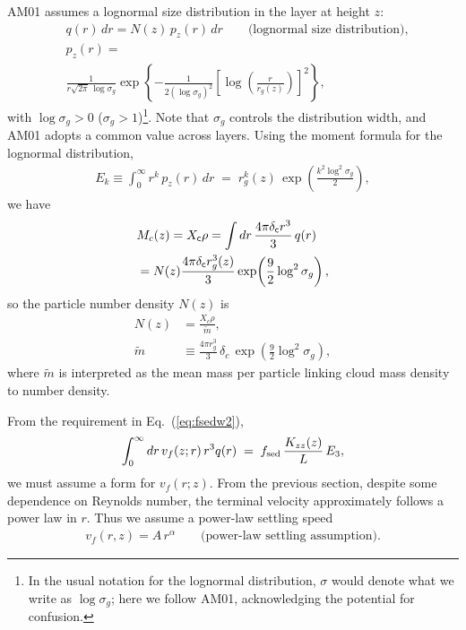 AM01 assumes a lognormal size distribution in the layer at height $z$:
\begin{align}
\label{eq:lognormal_am01}
&q(r)\, dr = N(z)\, p_z(r)\, dr \qquad\text{(lognormal size distribution)}, \\
&p_z(r) = \nonumber \\
&\frac{1}{r \sqrt{2 \pi}\, \log{\sigma_g}} 
\exp\!\left\{ - \frac{1}{2 (\log{\sigma_g})^2} \left[\log\!\left(\frac{r}{r_g(z)}\right)\right]^{\!2} \right\},
\end{align}
with $\log{\sigma_g}>0$ ($\sigma_g>1$)\footnote{In the usual notation for the lognormal distribution, $\sigma$ would denote what we write as $\log{\sigma_g}$; here we follow AM01, acknowledging the potential for confusion.}.  
Note that $\sigma_g$ controls the distribution width, and AM01 adopts a common value across layers.  
Using the moment formula for the lognormal distribution,
\begin{align}
E_k \equiv \int_0^\infty r^k\, p_z(r)\, dr \;=\; r_g^k(z)\, \exp\!\left(\frac{k^2 \log^2{\sigma_g}}{2}\right),
\end{align}
we have
\begin{align}
&M_c(z) = X_{\mathsf{c}} \rho 
= \int dr \, \frac{4 \pi \delta_{\mathsf{c}} r^3}{3}\, q(r) \nonumber \\
&= N(z) \frac{4 \pi \delta_{\mathsf{c}} r_g^3(z)}{3} \exp\!\left(\frac{9}{2}\log^2 \sigma_g\right),
\end{align}
so the particle number density $N(z)$ is
\begin{align}
\label{eq:lognormal_am01N}
N(z) &= \frac{X_c \rho}{\tilde{m}}, \\ 
\label{eq:lognormal_mean_mass}
\tilde{m} &\equiv \frac{4 \pi r_g^3}{3}\, \delta_c \, \exp\!\left(\frac{9}{2} \log^2{\sigma_g} \right),
\end{align}
where $\tilde{m}$ is interpreted as the mean mass per particle linking cloud mass density to number density.

From the requirement in Eq.~(\ref{eq:fsedw2}),
\begin{align}
\label{eq:xaxax}
 \int_0^\infty dr \, v_f(z;r)\, r^3 q(r) \;=\; f_\mathrm{sed}\, \frac{K_{zz}(z)}{L}\, E_3,
\end{align}
we must assume a form for $v_f(r; z)$.  
From the previous section, despite some dependence on Reynolds number, the terminal velocity approximately follows a power law in $r$.  
Thus we assume a power-law settling speed
\begin{align}
v_f(r,z) = A\, r^\alpha \qquad\text{(power-law settling assumption)}.
\end{align}


